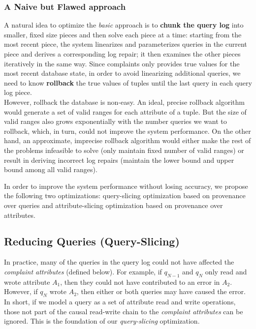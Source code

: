  \subsubsection{A Naive but Flawed approach}
  A natural idea to optimize the \emph{basic} approach is 
  to \textbf{chunk the query log} into
  smaller, fixed size pieces and then solve each piece at a time: starting
  from the most recent piece, the system linearizes and parameterizes queries 
  in the current piece and derives a corresponding log repair; 
  it then examines the other pieces iteratively
  in the same way. Since complaints only provides
  true values for the most recent database state, in order to avoid 
  linearizing additional queries, 
  we need to know \textbf{rollback} the true values of tuples 
  until the last query in each query log piece. \\
  However, rollback the database is non-easy. An ideal, precise rollback
  algorithm would generate a set of valid ranges for each attribute of a tuple. 
  But the size of valid ranges also grows exponentially with the number queries
  we want to rollback, which, in turn, could not improve the system performance. 
  On the other hand, an approximate, imprecise 
  rollback algorithm would either make the rest of the problems
  infeasible to solve (only maintain fixed number of valid ranges) 
  or result in deriving 
  incorrect log repairs (maintain the lower 
  bound and upper bound among all valid ranges).
    

  In order to improve the system performance without losing accuracy, we propose
  the following two optimizations: query-slicing optimization 
  based on provenance over queries and
  attribute-slicing optimization based on provenance over 
  attributes. 
\fi





\subsection{Reducing Queries (Query-Slicing)}
\label{sec:opt:query}


In practice, many of the queries in the query log could not have affected the \emph{complaint attributes} (defined below). For example, if $q_{N-1}$ and $q_{N}$ 
only read and wrote attribute $A_1$, then they could not have contributed to an error in $A_2$.  
However, if $q_{N}$  wrote $A_2$, then either or both queries may have caused the error. 
In short, if we model a query as a set of attribute read and write operations, those 
not part of the causal read-write chain to the \emph{complaint attributes} can be ignored.
This is the foundation of our \emph{query-slicing} optimization.

